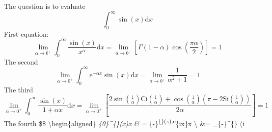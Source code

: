 \documentclass[
]{article}
\author{}
\date{}
\begin{document}
{
\setcounter{tocdepth}{3}
\tableofcontents
}
The question is to evaluate \[
\int_0^\infty\sin(x) \mathrm{d}x
\] First equation: \[
\lim_{\alpha \to 0^+} \int_0^\infty \frac{\sin(x)}{x^\alpha}\mathrm{d} x = \lim_{\alpha \to 0^+} \left[ \Gamma(1-\alpha) \cos\left( \frac{\pi \alpha}{2} \right) \right] = 1
\] The second \[
\lim_{\alpha \to 0^+} \int_0^\infty \mathrm{e}^{-\alpha x} \sin(x) \mathrm{d} x = \lim_{\alpha \to 0^+} \frac{1}{\alpha^2 + 1}  = 1
\] The third \[
\lim_{\alpha \to 0^+} \int_0^\infty \frac{\sin(x)}{1+\alpha x} \mathrm{d} x = 
   \lim_{\alpha \to 0^+} \left[ \frac{2 \sin \left(\frac{1}{\alpha }\right) \text{Ci}\left(\frac{1}{\alpha
   }\right)+\cos \left(\frac{1}{\alpha }\right) \left(\pi -2
   \text{Si}\left(\frac{1}{\alpha }\right)\right)}{2 \alpha } \right]  = 1
\] The fourth \$\$ \textbackslash begin\{aligned\}
\int\emph{\{0\}\^{}\{\infty\}\sin\left(x\right)x \& =
\int}\{-\infty\}\textsuperscript{\{\infty\}\Theta\left(x\right),e}\{ix\}x
\textbackslash{} \&= \int\_\{-\infty\}\^{}\{\infty\} \left(i
\end{document}
